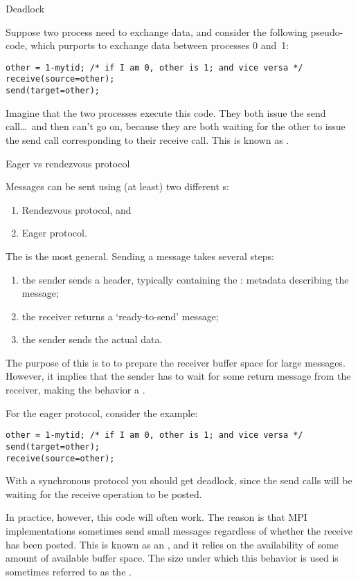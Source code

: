  {Deadlock}

Suppose two process need to exchange data, and consider the following
pseudo-code, which purports to exchange data between processes 0 and~1:
\begin{lstlisting}
other = 1-mytid; /* if I am 0, other is 1; and vice versa */
receive(source=other);
send(target=other);
\end{lstlisting}
Imagine that the two processes execute this code. They both issue the
send call\ldots\ and then can't go on, because they are both waiting
for the other to issue the send call corresponding to their receive call.
This is known as .

 {Eager vs rendezvous protocol}
\label{sec:eager-limit}

Messages can be sent using (at least) two different
s:
\begin{enumerate}
\item Rendezvous protocol, and
\item Eager protocol.
\end{enumerate}
The  is the most general.
Sending a message takes several steps:
\begin{enumerate}
\item the sender sends a header,
  typically containing the :
  metadata describing the message;
\item the receiver returns a `ready-to-send' message;
\item the sender sends the actual data.
\end{enumerate}
The purpose of this is to to prepare the receiver buffer space
for large messages. However, it implies that the sender has to
wait for some return message from the receiver,
making the behavior a .

For the eager protocol, consider the example:
\begin{lstlisting}
other = 1-mytid; /* if I am 0, other is 1; and vice versa */
send(target=other);
receive(source=other);
\end{lstlisting}
With a synchronous protocol you should get deadlock,
since the send calls will be waiting for the receive operation to be posted.

In practice, however, this code will often work. The reason is that
MPI implementations sometimes send small messages regardless of whether
the receive has been posted. This is known as an ,
and it relies on the availability of
some amount of available buffer space. The size under which this behavior
is used is sometimes referred to as the .

